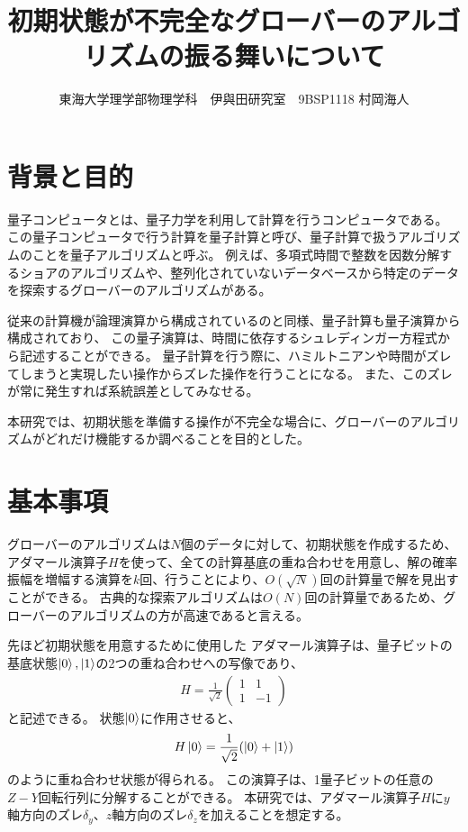 \documentclass[platex,dvipdfmx, twocolumn]{jsarticle}			%
\title{初期状態が不完全なグローバーのアルゴリズムの振る舞いについて}
\author{東海大学理学部物理学科　伊與田研究室　9BSP1118 村岡海人}
\date{}
\begin{document}
\maketitle
\section{背景と目的}
量子コンピュータとは、量子力学を利用して計算を行うコンピュータである。
この量子コンピュータで行う計算を量子計算と呼び、量子計算で扱うアルゴリズムのことを量子アルゴリズムと呼ぶ。
例えば、多項式時間で整数を因数分解するショアのアルゴリズムや、整列化されていないデータベースから特定のデータを探索するグローバーのアルゴリズムがある。

従来の計算機が論理演算から構成されているのと同様、量子計算も量子演算から構成されており、
この量子演算は、時間に依存するシュレディンガー方程式から記述することができる。
量子計算を行う際に、ハミルトニアンや時間がズレてしまうと実現したい操作からズレた操作を行うことになる。
また、このズレが常に発生すれば系統誤差としてみなせる。

本研究では、初期状態を準備する操作が不完全な場合に、グローバーのアルゴリズムがどれだけ機能するか調べることを目的とした。

\section{基本事項}
グローバーのアルゴリズムは$N個$のデータに対して、初期状態を作成するため、アダマール演算子$H$を使って、全ての計算基底の重ね合わせを用意し、解の確率振幅を増幅する演算を$k$回、行うことにより、$O(\sqrt{N})$回の計算量で解を見出すことができる。
古典的な探索アルゴリズムは$O(N)$回の計算量であるため、グローバーのアルゴリズムの方が高速であると言える\cite{QuantumDojo}。

先ほど初期状態を用意するために使用した
アダマール演算子は、量子ビットの基底状態$\ket{0},\ket{1}$の2つの重ね合わせへの写像であり、
\begin{eqnarray*}
    H = \frac{1}{\sqrt{2}}\begin{pmatrix}
        1 & 1\\
        1 & -1
    \end{pmatrix}
\end{eqnarray*}
と記述できる。
状態$\ket{0}$に作用させると、
\begin{eqnarray*}
    H\ket{0} = \frac{1}{\sqrt{2}}(\ket{0} + \ket{1})
\end{eqnarray*}
のように重ね合わせ状態が得られる\cite{BasicQuantumComputer}。
この演算子は、1量子ビットの任意の$Z-Y$回転行列に分解することができる。
本研究では、アダマール演算子$H$に$y$軸方向のズレ$\delta_y$、$z$軸方向のズレ$\delta_z$を加えることを想定する\cite{QuantumComputingFundamentalsAndPhysicsContacts}。
\end{document}
